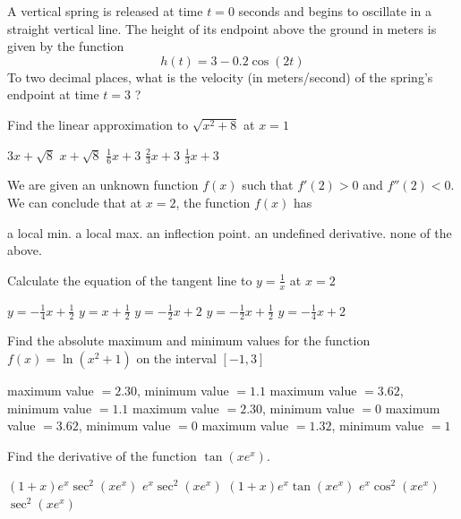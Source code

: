 \documentclass[11pt]{article}
\begin{document}
\begin{questions}
\begin{multiplechoice}{5}
\question A vertical spring is released at time $t = 0$ seconds and begins to oscillate in a straight vertical line.
The height of its endpoint above the ground in meters is given by the function
$$h(t) = 3 - 0.2\cos(2t)$$
To two decimal places, what is the velocity (in meters/second) of the spring's endpoint at time $t = 3$ ?
\begin{answers}{3}
\end{answers}

\newpage

\question Find the linear approximation to $\sqrt{x^2+8}$ at $x = 1$
\begin{answers}{2}
\ans $3x + \sqrt{8}$
\ans $x + \sqrt{8}$
\ans $\frac{1}{6} x + 3$
\ans $\frac{2}{3}x + 3$
\ans $\frac{1}{3} x + 3$
\end{answers}


\question We are given an unknown function $f(x)$ such that $f'(2) > 0$ and $f''(2) < 0$.
We can conclude that at $x = 2$, the function $f(x)$ has 
\begin{answers}{2}
\ans a local min.
\ans a local max.
\ans an inflection point.
\ans an undefined derivative.
\ans none of the above.
\end{answers}

\question Calculate the equation of the tangent line to $y = \frac{1}{x}$ at $x = 2$
\begin{answers}{2}
\ans $y = -\frac{1}{4}x + \frac{1}{2}$
\ans $y = x + \frac{1}{2}$
\ans $y = -\frac{1}{2}x + 2$
\ans $y = -\frac{1}{2}x + \frac{1}{2}$
\ans $y = -\frac{1}{4}x + 2$
\end{answers}







\question Find the absolute maximum and minimum values for the function 
$f(x) = \ln(x^2 + 1)$ on the interval $[-1, 3]$
\begin{answers}{1}
\ans maximum value $= 2.30$, minimum value $ = 1.1$
\ans maximum value $= 3.62$, minimum value $ = 1.1$
\ans maximum value $= 2.30$, minimum value $ = 0$
\ans maximum value $= 3.62$, minimum value $ = 0$
\ans maximum value $= 1.32$, minimum value $ = 1$
\end{answers}

\newpage

\question Find the derivative of the function $\tan(x e^x)$.
\begin{answers}{2}
\ans $(1+x)e^x \sec^2(xe^x) $
\ans $e^x \sec^2(xe^x) $
\ans $(1+x)e^x \tan(xe^x) $
\ans $e^x \cos^2(xe^x) $
\ans $\sec^2(xe^x) $
\end{answers}



\end{multiplechoice}
\end{questions}
\end{document}
